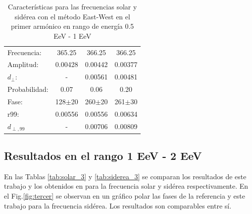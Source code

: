 \begin{table}[H]
        \begin{small}
            \begin{center}
                \begin{tabular}[c]{l|c||c|c}
                    Frecuencia:     & 365.25	    & 366.25		& 366.25\cite{Aab_2020}\\
                    Amplitud:       & 0.00428       & 0.00442	    & 0.00377\\
                    $d_\perp$:      & -             & 0.00561       & 0.00481\\
                    Probabilidad:   & 0.07          & 0.06	        & 0.20\\
                    Fase:           & 128$\pm$20	& 260$\pm$20	& 261$\pm$30\\
                    r99:            & 0.00556	    & 0.00556       & 0.00634\\
                    $d_{\perp,99}$  & -             & 0.00706       &0.00809\\
                \end{tabular}
            \end{center}
        \end{small}
        \caption{Características para las frecuencias solar y sidérea con el método East-West en el primer armónico en rango de energía 0.5 EeV - 1 EeV}
        \label{tab:solar}
    \end{table}

    


\subsection*{Resultados en el rango 1 EeV - 2 EeV}

 
En las Tablas \ref{tab:solar_3} y \ref{tab:siderea_3} se comparan los resultados de este trabajo y los obtenidos en \cite{Aab_2020} para la frecuencia solar y sidérea respectivamente. En el Fig.\ref{fig:tercer} se observan en un gráfico polar las fases de la referencia y este trabajo para la frecuencia sidérea. Los resultados son comparables entre sí.
    
